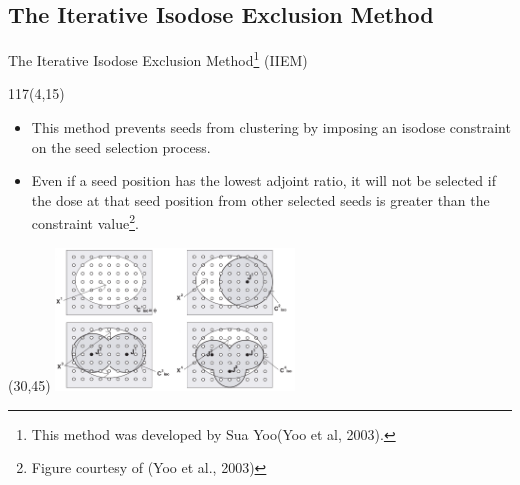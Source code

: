 \documentclass{beamer}
\begin{document}
\subsection{The Iterative Isodose Exclusion Method}
\begin{frame}{The Iterative Isodose Exclusion Method\footnote{This method was developed by Sua Yoo(Yoo et al, 2003).} (IIEM)}
  
  \begin{textblock}{117}(4,15)
    \begin{itemize}
      \item This method prevents seeds from clustering by imposing an isodose
        constraint on the seed selection process.
        \medskip
      \item Even if a seed position has the lowest adjoint ratio, it will not
        be selected if the dose at that seed position from other selected seeds
        is greater than the constraint value\footnote{Figure courtesy of 
          (Yoo et al., 2003)}.
    \end{itemize}
  \end{textblock}

  \begin{textblock}{40}(30,45)
    \includegraphics[width=2.5in]{figures/IIEM.png}
    
  \end{textblock}
  
\end{frame}
\end{document}
